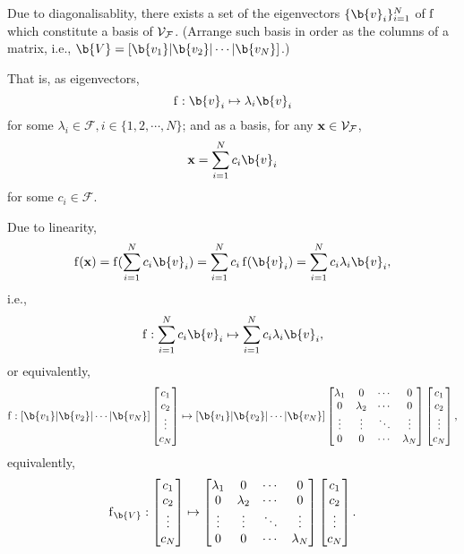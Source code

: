 Due to diagonalisablity, there exists a set of the eigenvectors $\{\b{v}_i\}_{i=1}^N$ of $\operatorname{f}$ which constitute a basis of $\mathcal{V}_{\mathcal{F}}$. (Arrange such basis in order as the columns of a matrix, i.e., $\b{V} = \left[ \b{v_1} | \b{v_2}| \cdots |\b{v_N} \right]$.)

That is, as eigenvectors, $$\f: \b{v}_i \mapsto \lambda_i \b{v}_i$$ for some $\lambda_i \in \mathcal{F}, i \in \{1,2,\cdots,N\}$; and as a basis, for any $\mathbf{x} \in \mathcal{V}_{\mathcal{F}}$, $$\x =\sum_{i=1}^{N} c_i\b{v}_i$$ for some $c_i \in \mathcal{F}$.

Due to linearity, $$\f(\x) = \f(\sum_{i=1}^{N} c_i\b{v}_i) = \sum_{i=1}^{N} c_i \f(\b{v}_i) = \sum_{i=1}^{N} c_i \lambda_i \b{v}_i,$$
i.e.,
$$\f: \sum_{i=1}^{N} c_i\b{v}_i \mapsto \sum_{i=1}^{N} c_i \lambda_i \b{v}_i,$$
or equivalently,
$$\f:
\left[ \b{v_1} | \b{v_2}| \cdots |\b{v_N} \right]\begin{bmatrix}
c_1 \\
c_2 \\
\vdots \\
c_N
\end{bmatrix}
\mapsto 
\left[ \b{v_1} | \b{v_2}| \cdots |\b{v_N} \right]\begin{bmatrix}
\lambda_1 &0 &\cdots &0 \\
0  &\lambda_2 &\cdots &0 \\
\vdots   &\vdots  &\ddots &\vdots  \\
0  &0 &\cdots &\lambda_N 
\end{bmatrix}
\begin{bmatrix}
c_1 \\
c_2 \\
\vdots \\
c_N
\end{bmatrix},
$$
equivalently,
$$\f_{\b{V}}:
\begin{bmatrix}
c_1 \\
c_2 \\
\vdots \\
c_N
\end{bmatrix}
\mapsto 
\begin{bmatrix}
\lambda_1 &0 &\cdots &0 \\
0  &\lambda_2 &\cdots &0 \\
\vdots   &\vdots  &\ddots &\vdots  \\
0  &0 &\cdots &\lambda_N 
\end{bmatrix}
\begin{bmatrix}
c_1 \\
c_2 \\
\vdots \\
c_N
\end{bmatrix}.
$$

